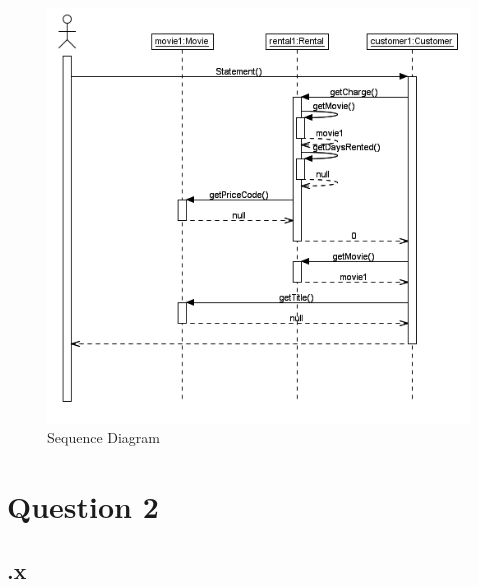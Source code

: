 \documentclass{article}
\begin{document}
\begin{figure}
	\includegraphics[width=\linewidth]{Q1Sequence.PNG}
	\caption{Sequence Diagram}
	\label{fig:seq}
\end{figure}
\section*{Question 2}
\subsection*{.x}
\begin{Verbatim}

\end{Verbatim}
\end{document}
